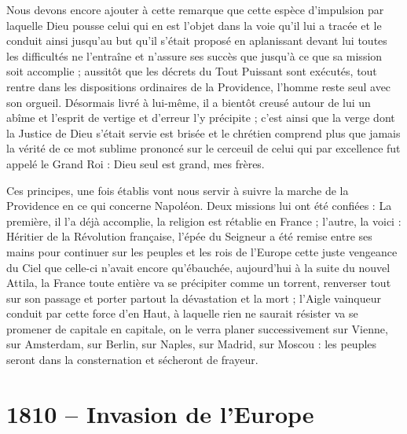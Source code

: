 \documentclass[11pt,a4paper]{report}
\begin{document}
Nous devons encore ajouter à cette remarque que cette espèce d'impulsion par laquelle Dieu pousse celui qui en est l'objet dans la voie qu'il lui a tracée et le conduit ainsi jusqu'au but qu'il s'était proposé en aplanissant devant lui toutes les difficultés ne l'entraîne et n'assure ses succès que jusqu'à ce que sa mission soit accomplie ; aussitôt que les décrets du Tout Puissant sont exécutés, tout rentre dans les dispositions ordinaires de la Providence, l'homme reste seul avec son orgueil. Désormais livré à lui-même, il a bientôt creusé autour de lui un abîme et l'esprit de vertige et d'erreur l'y précipite ; c'est ainsi que la verge dont la Justice de Dieu s'était servie est brisée et le chrétien comprend plus que jamais la vérité de ce mot sublime prononcé sur le cerceuil de celui qui par excellence fut appelé le Grand Roi : Dieu seul est grand, mes frères.

Ces principes, une fois établis vont nous servir à suivre la marche de la Providence en ce qui concerne Napoléon. Deux missions lui ont été confiées : La première, il l'a déjà accomplie, la religion est rétablie en France ; l'autre, la voici : Héritier de la Révolution française, l'épée du Seigneur a été remise entre ses mains pour continuer sur les peuples et les rois de l'Europe cette juste vengeance du Ciel que celle-ci n'avait encore qu'ébauchée, aujourd'hui à la suite du nouvel Attila, la France toute entière va se précipiter comme un torrent, renverser tout sur son passage et porter partout la dévastation et la mort ; l'Aigle vainqueur conduit par cette force d'en Haut, à laquelle rien ne saurait résister va se promener de capitale en capitale, on le verra planer successivement sur Vienne, sur Amsterdam, sur Berlin, sur Naples, sur Madrid, sur Moscou : les peuples seront dans la consternation et sécheront de frayeur.

\section*{1810 -- Invasion de l'Europe}
\end{document}
